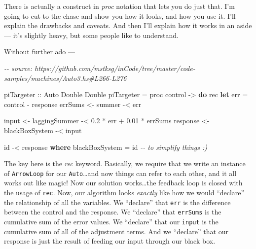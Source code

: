 \documentclass[]{article}
\newenvironment{Shaded}{}{}
\newcommand{\CommentTok}[1]{\textcolor[rgb]{0.38,0.63,0.69}{\textit{#1}}}
\newcommand{\DataTypeTok}[1]{\textcolor[rgb]{0.56,0.13,0.00}{#1}}
\newcommand{\FloatTok}[1]{\textcolor[rgb]{0.25,0.63,0.44}{#1}}
\newcommand{\FunctionTok}[1]{\textcolor[rgb]{0.02,0.16,0.49}{#1}}
\newcommand{\KeywordTok}[1]{\textcolor[rgb]{0.00,0.44,0.13}{\textbf{#1}}}
\newcommand{\NormalTok}[1]{#1}
\newcommand{\OperatorTok}[1]{\textcolor[rgb]{0.40,0.40,0.40}{#1}}
\newcommand{\OtherTok}[1]{\textcolor[rgb]{0.00,0.44,0.13}{#1}}
\begin{document}
There is actually a construct in \emph{proc} notation that lets you do just
that. I'm going to cut to the chase and show you how it looks, and how you use
it. I'll explain the drawbacks and caveats. And then I'll explain how it works
in an aside --- it's slightly heavy, but some people like to understand.

Without further ado ---

\begin{Shaded}
\begin{Highlighting}[]
\CommentTok{{-}{-} source: https://github.com/mstksg/inCode/tree/master/code{-}samples/machines/Auto3.hs\#L266{-}L276}

\OtherTok{piTargeter ::} \DataTypeTok{Auto} \DataTypeTok{Double} \DataTypeTok{Double}
\NormalTok{piTargeter }\OtherTok{=}\NormalTok{ proc control }\OtherTok{{-}>} \KeywordTok{do}
\NormalTok{    rec }\KeywordTok{let}\NormalTok{ err }\OtherTok{=}\NormalTok{ control }\OperatorTok{{-}}\NormalTok{ response}
\NormalTok{        errSums  }\OtherTok{<{-}}\NormalTok{ summer         }\OperatorTok{{-}<}\NormalTok{ err}

\NormalTok{        input    }\OtherTok{<{-}}\NormalTok{ laggingSummer  }\OperatorTok{{-}<} \FloatTok{0.2} \OperatorTok{*}\NormalTok{ err }\OperatorTok{+} \FloatTok{0.01} \OperatorTok{*}\NormalTok{ errSums}
\NormalTok{        response }\OtherTok{<{-}}\NormalTok{ blackBoxSystem }\OperatorTok{{-}<}\NormalTok{ input}

    \FunctionTok{id} \OperatorTok{{-}<}\NormalTok{ response}
  \KeywordTok{where}
\NormalTok{    blackBoxSystem }\OtherTok{=} \FunctionTok{id}     \CommentTok{{-}{-} to simplify things :)}
\end{Highlighting}
\end{Shaded}

The key here is the \emph{rec} keyword. Basically, we require that we write an
instance of \texttt{ArrowLoop} for our \texttt{Auto}\ldots and now things can
refer to each other, and it all works out like magic! Now our solution
works\ldots the feedback loop is closed with the usage of \texttt{rec}. Now, our
algorithm looks \emph{exactly} like how we would ``declare'' the relationship of
all the variables. We ``declare'' that \texttt{err} is the difference between
the control and the response. We ``declare'' that \texttt{errSums} is the
cumulative sum of the error values. We ``declare'' that our \texttt{input} is
the cumulative sum of all of the adjustment terms. And we ``declare'' that our
response is just the result of feeding our input through our black box.
\end{document}
